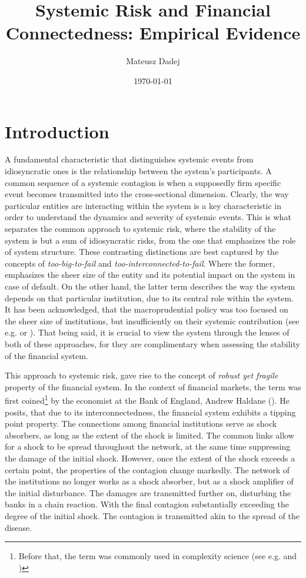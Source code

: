 \documentclass[12pt]{article}
\title{Systemic Risk and Financial Connectedness: Empirical Evidence}
\author{Mateusz Dadej}
\date{\today}
\begin{document}
\maketitle

\section{Introduction}\label{section:introduction}

A fundamental characteristic that distinguishes systemic events from idiosyncratic ones is the relationship between the system's participants. A common sequence of a systemic contagion is when a supposedly firm specific event becomes transmitted into the cross-sectional dimension. Clearly, the way particular entities are interacting within the system is a key characteristic in order to understand the dynamics and severity of systemic events. This is what separates the common approach to systemic risk, where the stability of the system is but a sum of idiosyncratic risks, from the one that emphasizes the role of system structure. These contrasting distinctions are best captured by the concepts of \textit{too-big-to-fail} and \textit{too-interconnected-to-fail}. Where the former, emphasizes the sheer size of the entity and its potential impact on the system in case of default. On the other hand, the latter term describes the way the system depends on that particular institution, due to its central role within the system. It has been acknowledged, that the macroprudential policy was too focused on the sheer size of institutions, but insufficiently on their systemic contribution (see e.g. \cite{bernanke09} or \cite{rajan09}). That being said, it is crucial to view the system through the lenses of both of these approaches, for they are complimentary when assessing the stability of the financial system.

This approach to systemic risk, gave rise to the concept of \textit{robust yet fragile} property of the financial system. In the context of financial markets, the term was first coined\footnote{Before that, the term was commonly used in complexity science (see e.g. \cite{doyle05} and \cite{carlson02})} by the economist at the Bank of England, Andrew Haldane (\cite{haldane13}). He posits, that due to its interconnectedness, the financial system exhibits a tipping point property. The connections among financial institutions serve as shock absorbers, as long as the extent of the shock is limited. The common links allow for a shock to be spread throughout the network, at the same time suppressing the damage of the initial shock. However, once the extent of the shock exceeds a certain point, the properties of the contagion change markedly. The network of the institutions no longer works as a shock absorber, but as a shock amplifier of the initial disturbance. The damages are transmitted further on, disturbing the banks in a chain reaction. With the final contagion substantially exceeding the degree of the initial shock. The contagion is transmitted akin to the spread of the disease. 
\end{document}

